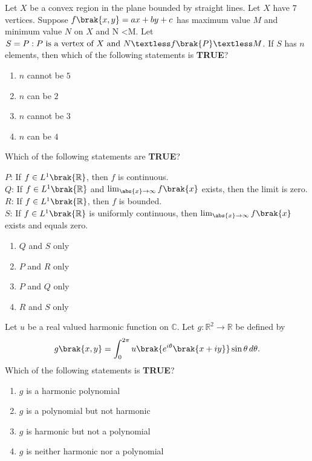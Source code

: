    \item Let $X$ be a convex region in the plane bounded by straight lines. Let $X$ have $7$ vertices. Suppose $f \brak{x, y} = ax + by + c$ has maximum value $M$ and minimum value $N$ on $X$ and N \textless M. Let $S = {P: P \text{ is a vertex of } X \text{ and } N \textless f \brak{P} \textless M}$. If $S$ has $n$ elements, then which of the following statements is \textbf{TRUE}?
    \begin{enumerate}
        \item $n$ cannot be $5$
        \item $n$ can be $2$
        \item $n$ cannot be $3$
        \item $n$ can be $4$
    \end{enumerate}

    \item Which of the following statements are \textbf{TRUE}?
    
    $P$: If $f \in L^1 \brak{\mathbb{R}}$, then $f$ is continuous. \\
    $Q$: If $f \in L^1 \brak{\mathbb{R}}$ and $\lim_{\abs{x} \to \infty} f \brak{x}$ exists, then the limit is zero. \\
    $R$: If $f \in L^1 \brak{\mathbb{R}}$, then $f$ is bounded. \\
    $S$: If $f \in L^{1} \brak{\mathbb{R}}$ is uniformly continuous, then $\lim_{\abs{x} \to \infty} f \brak{x}$ exists and equals zero.
    
    \begin{enumerate}
        \item $Q$ and $S$ only
        \item $P$ and $R$ only
        \item $P$ and $Q$ only
        \item $R$ and $S$ only
    \end{enumerate}

    \item Let $u$ be a real valued harmonic function on $\mathbb{C}$. Let $g: \mathbb{R}^{2} \rightarrow \mathbb{R}$ be defined by
    \[
    g \brak{x, y} = \int_{0}^{2 \pi} u \brak{e^{i \theta} \brak{x + iy}} \sin \theta \, d \theta.
    \]
    Which of the following statements is \textbf{TRUE}?
    \begin{enumerate}
        \item $g$ is a harmonic polynomial
        \item $g$ is a polynomial but not harmonic
        \item $g$ is harmonic but not a polynomial
        \item $g$ is neither harmonic nor a polynomial
    \end{enumerate}

